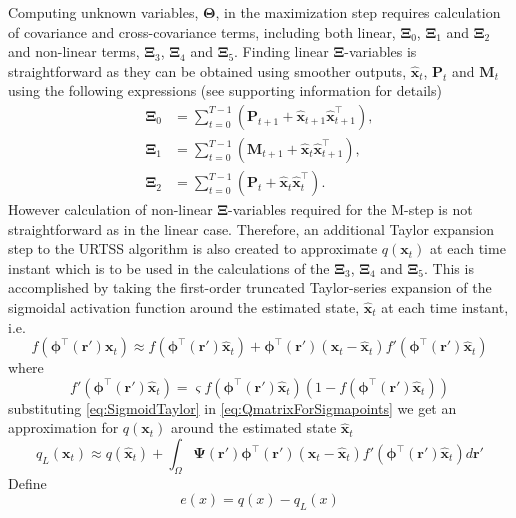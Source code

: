 \documentclass[]{article}
\begin{document}
Computing unknown variables, $\boldsymbol\Theta$, in the maximization step requires calculation of covariance and  cross-covariance terms, including both linear, $\boldsymbol\Xi_0$, $\boldsymbol\Xi_1$ and $\boldsymbol\Xi_2$ and non-linear terms, $\boldsymbol\Xi_3$, $\boldsymbol\Xi_4$ and  $\boldsymbol\Xi_5$. Finding linear $\boldsymbol\Xi$-variables is straightforward as they can be obtained using smoother outputs, $\hat{\mathbf x}_t $, $\mathbf P_t$ and $\mathbf M_t$ using the following expressions \cite{Shumway2000} (see supporting information for details)
\begin{align}
	\boldsymbol\Xi_{0}&=\sum_{t=0}^{T-1}\left(\mathbf P_{t+1}+\mathbf{\hat x}_{t+1}\mathbf{\hat x}_{t+1}^\top\right)\label{eq:defofXi0}, \\
\boldsymbol\Xi_{1}&=\sum_{t=0}^{T-1}\left(\mathbf M_{t+1}+\mathbf{\hat x}_t\mathbf{\hat x}_{t+1}^\top\right) \label{eq:defofXi1}, \\
\boldsymbol\Xi_{2}&=\sum_{t=0}^{T-1}\left(\mathbf P_t+\mathbf{\hat x}_t\mathbf{\hat x}_t^\top\right).
 \end{align}
However calculation of non-linear $\boldsymbol\Xi$-variables required for the M-step is not straightforward as in the linear case. Therefore, an additional  Taylor expansion step to the URTSS algorithm is also created to approximate $q(\mathbf{x}_t)$ at each time instant which is to be used in the calculations of the $\boldsymbol\Xi_3$, $\boldsymbol\Xi_4$ and $\boldsymbol\Xi_5$. This is accomplished by taking the first-order truncated Taylor-series expansion of the sigmoidal activation function  around the estimated state, $\hat{\mathbf x}_t$ at each time instant, i.e.
\begin{equation}\label{eq:SigmoidTaylor}
 f\left(\boldsymbol \phi^\top\left(\mathbf r'\right)\mathbf x_t\right) \approx f\left(\boldsymbol \phi^\top(\mathbf r')\hat{\mathbf x}_t\right)+  \boldsymbol \phi^\top\left(\mathbf r'\right)\left(\mathbf x_t - \hat{\mathbf x}_t\right)f'\left(\boldsymbol \phi^\top\left(\mathbf r'\right)\hat{\mathbf x}_t\right)
\end{equation}
where 
\begin{equation}\label{eq:SigmoidDerivative}
 f'\left(\boldsymbol \phi^\top\left(\mathbf r'\right)\hat{\mathbf x}_t\right)=\varsigma f\left(\boldsymbol \phi^\top\left(\mathbf r'\right)\hat{\mathbf x}_t\right)\left( 1-f\left( \boldsymbol \phi^\top\left(\mathbf r'\right)\hat{\mathbf x}_t\right)\right)
\end{equation}
substituting \ref{eq:SigmoidTaylor} in \ref{eq:QmatrixForSigmapoints}  we get an approximation for $q(\mathbf x_t)$ around the estimated state $\hat{\mathbf{x}}_t$ 
\begin{equation}\label{eq:qTaylor}
 q_L(\mathbf x_t) \approx q\left(\hat{\mathbf x}_t\right)+\int_\Omega \boldsymbol{\Psi}\left(\mathbf{r}'\right)\boldsymbol \phi^\top\left(\mathbf r'\right) \left(\mathbf x_t -\hat{\mathbf x}_t\right)f'\left(\boldsymbol \phi^\top\left(\mathbf r'\right)\hat{\mathbf x}_t\right) d\mathbf{r}'
\end{equation}
Define
\begin{equation}
	e(x) = q(x) - q_L(x) \nonumber
\end{equation}
\end{document}
